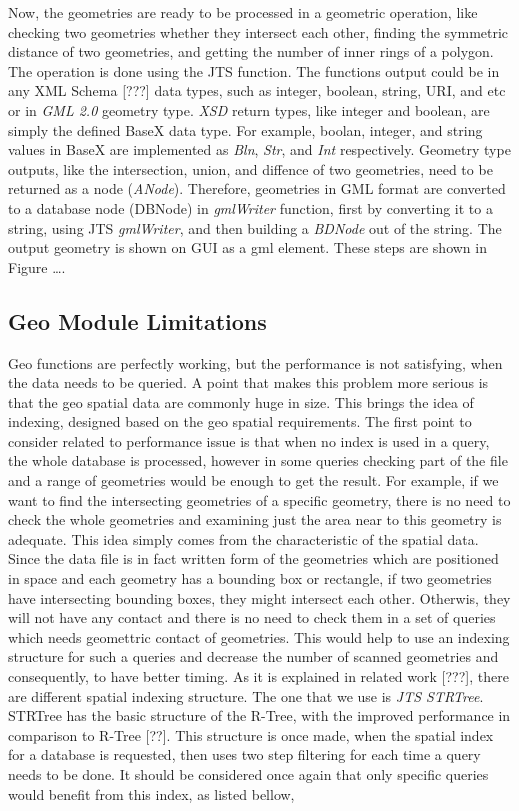 \documentclass[a4paper,12pt]{article}
\begin{document}
Now, the geometries are ready to be processed in a geometric operation, like checking two geometries whether they intersect each other, finding the symmetric distance of two geometries, and getting the number of inner rings of a polygon. The operation is done using the JTS function. The functions output could be in any XML Schema [???] data types, such as integer, boolean, string, URI, and etc or in \textit{GML 2.0} geometry type. \textit{XSD} return types, like integer and boolean, are simply the defined BaseX data type. For example, boolan, integer, and string values in BaseX are implemented as \textit{Bln}, \textit{Str}, and \textit{Int} respectively. Geometry type outputs, like the intersection, union, and diffence of two geometries, need to be returned as a node (\textit{ANode}). Therefore, geometries in GML format are converted to a database node (DBNode) in \textit{gmlWriter} function, first by converting it to a string, using JTS \textit{gmlWriter}, and then building a \textit{BDNode} out of the string. The output geometry is shown on GUI as a gml element. These steps are shown in Figure ….

\subsection{Geo Module Limitations}
Geo functions are perfectly working, but the performance is not satisfying, when the data needs to be queried. A point that makes this problem more serious is that the geo spatial data are commonly huge in size. This brings the idea of indexing, designed based on the geo spatial requirements.
The first point to consider related to performance issue is that when no index is used in a query, the whole database is processed, however in some queries checking part of the file and a range of geometries would be enough to get the result. For example, if we want to find the intersecting geometries of a specific geometry, there is no need to check the whole geometries and examining just the area near to this geometry is adequate. This idea simply comes from the characteristic of the spatial data. Since the data file is in fact written form of the geometries which are positioned in space and each geometry has a bounding box or rectangle, if two geometries have intersecting bounding boxes, they might intersect each other. Otherwis, they will not have any contact and there is no need to check them in a set of queries which needs geomettric contact of geometries.  
This would help to use an indexing structure for such a queries and decrease the number of scanned geometries and consequently, to have better timing.
As it is explained in related work [???], there are different spatial indexing structure. The one that we use is \textit{JTS STRTree}. STRTree has the basic structure of the R-Tree, with the improved performance in comparison to R-Tree [??]. This structure is once made, when the spatial index for a database is requested, then uses two step filtering for each time a query needs to be done. It should be considered once again that only specific queries would benefit from this index, as listed bellow,
\end{document}
